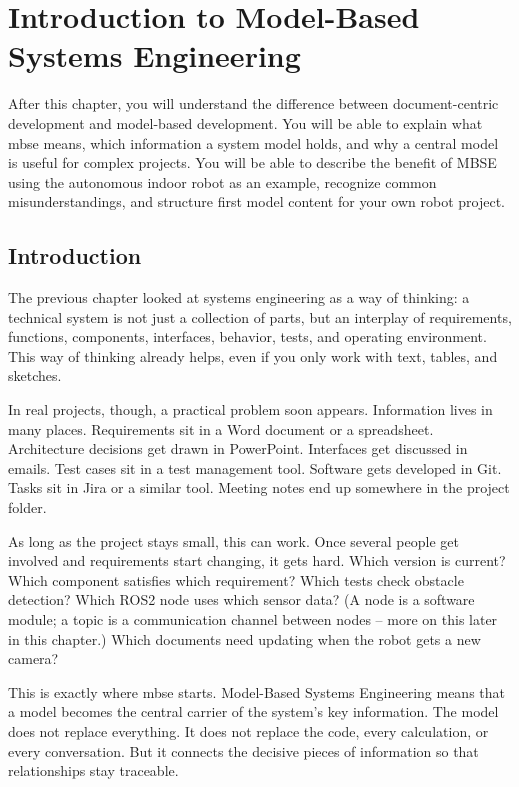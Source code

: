\chapter{Introduction to Model-Based Systems Engineering}

\begin{lernziele}
After this chapter, you will understand the difference between document-centric development and model-based development. You will be able to explain what \gls{mbse} means, which information a system model holds, and why a central model is useful for complex projects. You will be able to describe the benefit of MBSE using the autonomous indoor robot as an example, recognize common misunderstandings, and structure first model content for your own robot project.
\end{lernziele}

\section{Introduction}
The previous chapter looked at systems engineering as a way of thinking: a technical system is not just a collection of parts, but an interplay of requirements, functions, components, interfaces, behavior, tests, and operating environment. This way of thinking already helps, even if you only work with text, tables, and sketches.

In real projects, though, a practical problem soon appears. Information lives in many places. Requirements sit in a Word document or a spreadsheet. Architecture decisions get drawn in PowerPoint. Interfaces get discussed in emails. Test cases sit in a test management tool. Software gets developed in Git. Tasks sit in Jira or a similar tool. Meeting notes end up somewhere in the project folder.

As long as the project stays small, this can work. Once several people get involved and requirements start changing, it gets hard. Which version is current? Which component satisfies which requirement? Which tests check obstacle detection? Which ROS2 node uses which sensor data? (A node is a software module; a topic is a communication channel between nodes -- more on this later in this chapter.) Which documents need updating when the robot gets a new camera?

This is exactly where \gls{mbse} starts. Model-Based Systems Engineering means that a model becomes the central carrier of the system's key information. The model does not replace everything. It does not replace the code, every calculation, or every conversation. But it connects the decisive pieces of information so that relationships stay traceable.


